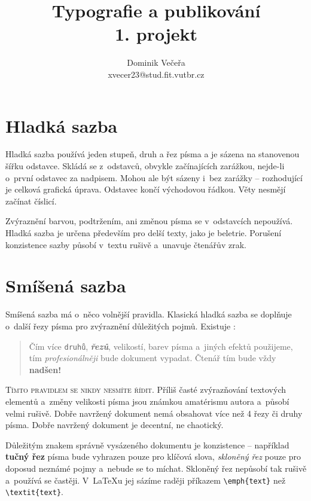 \documentclass[twocolumn, 10pt, a4paper]{article}
\title{Typografie a publikování \\ \vspace{0.3cm} \large 1. projekt}
\author{Dominik Večeřa \\ xvecer23@stud.fit.vutbr.cz}
\date{}
\begin{document}
\maketitle

\section{Hladká sazba}

Hladká sazba používá jeden stupeň, druh a řez písma a je sázena na stanovenou šířku odstavce. Skládá se z~odstavců, obvykle začínajících zarážkou, nejde-li o~první odstavec za nadpisem. Mohou ale být sázeny i~bez zarážky -- rozhodující je celková grafická úprava. Odstavec končí východovou řádkou. Věty nesmějí začínat číslicí.

Zvýraznění barvou, podtržením, ani změnou písma se v~odstavcích nepoužívá. Hladká sazba je určena především pro delší texty, jako je beletrie. Porušení konzistence sazby působí v~textu rušivě a~unavuje čtenářův zrak.

\section{Smíšená sazba} \label{2}

Smíšená sazba má o~něco volnější pravidla. Klasická hladká sazba se doplňuje o~další řezy písma pro zvýraznění důležitých pojmů. Existuje :

\begin{quotation}
Čím více \texttt{druhů}, {\itshape\bfseries řezů}, {\small velikostí}, barev písma {\selectfont a~jiných efektů} použijeme, tím \textit{profesionálněji} bude dokument vypadat. Čtenář tím {\tiny bude} vždy {\huge \textbf{nadšen!}}
\end{quotation}

\textsc{Tímto pravidlem se nikdy nesmíte řídit.} Příliš časté zvýrazňování textových elementů a~změny velikosti písma jsou známkou amatérismu autora a~působí velmi rušivě. Dobře navržený dokument nemá obsahovat více než
4 řezy či druhy písma. Dobře navržený dokument je decentní, ne chaotický.

Důležitým znakem správně vysázeného dokumentu je konzistence -- například \textbf{tučný řez} písma bude vyhrazen pouze pro klíčová slova, \textit{skloněný řez} pouze pro doposud neznámé pojmy a~nebude se to míchat. Skloněný řez nepůsobí tak rušivě a~používá se častěji. V~\LaTeX u jej sázíme raději příkazem \texttt{\textbackslash emph\{text\}} než \texttt{\textbackslash textit\{text\}}.
\end{document}
